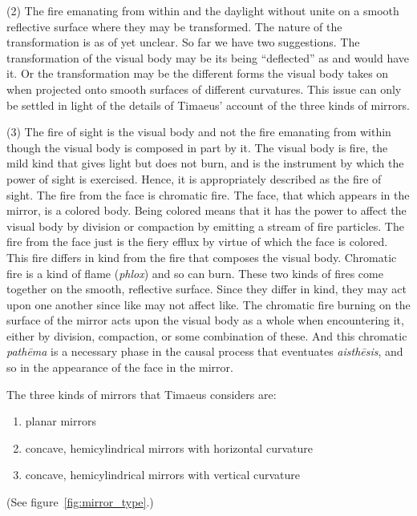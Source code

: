 (2) The fire emanating from within and the daylight without unite on a smooth reflective surface where they may be transformed. The nature of the transformation is as of yet unclear. So far we have two suggestions. The transformation of the visual body may be its being ``deflected'' as \citet[159]{Archer-Hind:1888qd} and \citet[103]{Bury:1929jb} would have it. Or the transformation may be the different forms the visual body takes on when projected onto smooth surfaces of different curvatures. This issue can only be settled in light of the details of Timaeus' account of the three kinds of mirrors.

(3) The fire of sight is the visual body and not the fire emanating from within though the visual body is composed in part by it. The visual body is fire, the mild kind that gives light but does not burn, and is the instrument by which the power of sight is exercised. Hence, it is appropriately described as the fire of sight. The fire from the face is chromatic fire. The face, that which appears in the mirror, is a colored body. Being colored means that it has the power to affect the visual body by division or compaction by emitting a stream of fire particles. The fire from the face just is the fiery efflux by virtue of which the face is colored. This fire differs in kind from the fire that composes the visual body. Chromatic fire is a kind of flame (\emph{phlox}) and so can burn. These two kinds of fires come together on the smooth, reflective surface. Since they differ in kind, they may act upon one another since like may not affect like. The chromatic fire burning on the surface of the mirror acts upon the visual body as a whole when encountering it, either by division, compaction, or some combination of these. And this chromatic \emph{pathēma} is a necessary phase in the causal process that eventuates \emph{aisthēsis}, and so in the appearance of the face in the mirror.

The three kinds of mirrors that Timaeus considers are:
\begin{enumerate}[(1)]
	\item planar mirrors
	\item concave, hemicylindrical mirrors with horizontal curvature
	\item concave, hemicylindrical mirrors with vertical curvature
\end{enumerate}
(See figure~\ref{fig:mirror_type}.)

